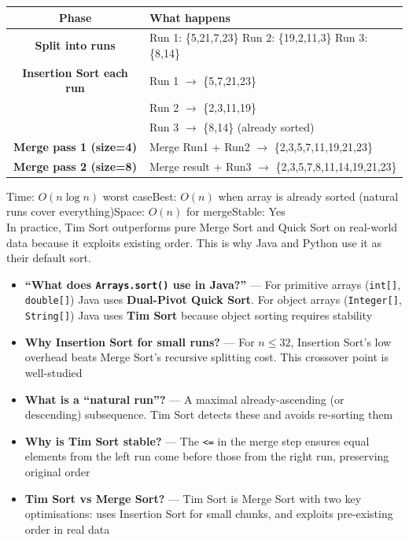 \documentclass[12pt,a4paper,oneside]{book}
\begin{document}
\begin{dryrun}[Dry Run concept: arr = \{5, 21, 7, 23, 19, 2, 11, 3, 8, 14\}, RUN = 4]
\begin{center}
\begin{tabular}{cl}
\toprule
\textbf{Phase} & \textbf{What happens}\\
\midrule
\textbf{Split into runs} & Run 1: \{5,21,7,23\} \quad Run 2: \{19,2,11,3\} \quad Run 3: \{8,14\}\\
\textbf{Insertion Sort each run} & Run 1 $\to$ \{5,7,21,23\}\\
  & Run 2 $\to$ \{2,3,11,19\}\\
  & Run 3 $\to$ \{8,14\} (already sorted)\\
\textbf{Merge pass 1 (size=4)} & Merge Run1 + Run2 $\to$ \{2,3,5,7,11,19,21,23\}\\
\textbf{Merge pass 2 (size=8)} & Merge result + Run3 $\to$ \{2,3,5,7,8,11,14,19,21,23\}\\
\bottomrule
\end{tabular}
\end{center}
\end{dryrun}

\begin{complexity}
Time: $O(n \log n)$ worst case\quad Best: $O(n)$ when array is already sorted (natural runs cover everything)\quad Space: $O(n)$ for merge\quad Stable: Yes\\[4pt]
In practice, Tim Sort outperforms pure Merge Sort and Quick Sort on real-world data because it exploits existing order. This is why Java and Python use it as their default sort.
\end{complexity}

\begin{interviewcorner}
\begin{itemize}
  \item \textbf{``What does \texttt{Arrays.sort()} use in Java?''} --- For primitive arrays (\texttt{int[]}, \texttt{double[]}) Java uses \textbf{Dual-Pivot Quick Sort}. For object arrays (\texttt{Integer[]}, \texttt{String[]}) Java uses \textbf{Tim Sort} because object sorting requires stability
  \item \textbf{Why Insertion Sort for small runs?} --- For $n \leq 32$, Insertion Sort's low overhead beats Merge Sort's recursive splitting cost. This crossover point is well-studied
  \item \textbf{What is a ``natural run''?} --- A maximal already-ascending (or descending) subsequence. Tim Sort detects these and avoids re-sorting them
  \item \textbf{Why is Tim Sort stable?} --- The \texttt{<=} in the merge step ensures equal elements from the left run come before those from the right run, preserving original order
  \item \textbf{Tim Sort vs Merge Sort?} --- Tim Sort is Merge Sort with two key optimisations: uses Insertion Sort for small chunks, and exploits pre-existing order in real data
\end{itemize}
\end{interviewcorner}
\end{document}
